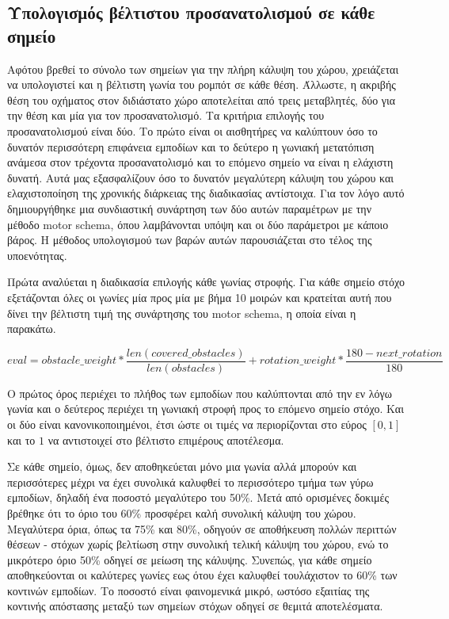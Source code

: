 \subsection{Υπολογισμός βέλτιστου προσανατολισμού σε κάθε σημείο}
\label{subsection:find_pose}

Αφότου βρεθεί το σύνολο των σημείων για την πλήρη κάλυψη του χώρου, χρειάζεται να υπολογιστεί και η βέλτιστη γωνία του ρομπότ σε κάθε θέση. Άλλωστε, η ακριβής θέση του οχήματος στον διδιάστατο χώρο αποτελείται από τρεις μεταβλητές, δύο για την θέση και μία για τον προσανατολισμό. Τα κριτήρια επιλογής του προσανατολισμού είναι δύο. Το πρώτο είναι οι αισθητήρες να καλύπτουν όσο το δυνατόν περισσότερη επιφάνεια εμποδίων και το δεύτερο η γωνιακή μετατόπιση ανάμεσα στον τρέχοντα προσανατολισμό και το επόμενο σημείο να είναι η ελάχιστη δυνατή. Αυτά μας εξασφαλίζουν όσο το δυνατόν μεγαλύτερη κάλυψη του χώρου και ελαχιστοποίηση της χρονικής διάρκειας της διαδικασίας αντίστοιχα. Για τον λόγο αυτό δημιουργήθηκε μια συνδιαστική συνάρτηση των δύο αυτών παραμέτρων με την μέθοδο motor schema, όπου λαμβάνονται υπόψη και οι δύο παράμετροι με κάποιο βάρος. Η μέθοδος υπολογισμού των βαρών αυτών παρουσιάζεται στο τέλος της υποενότητας.

Πρώτα αναλύεται η διαδικασία επιλογής κάθε γωνίας στροφής. Για κάθε σημείο στόχο εξετάζονται όλες οι γωνίες μία προς μία με βήμα 10 μοιρών και κρατείται αυτή που δίνει την βέλτιστη τιμή της συνάρτησης του motor schema, η οποία είναι η παρακάτω.

\[eval = obstacle\_weight * \frac{len(covered\_obstacles)}{len(obstacles)} + rotation\_weight * \frac{180 - next\_rotation}{180}\]

Ο πρώτος όρος περιέχει το πλήθος των εμποδίων που καλύπτονται από την εν λόγω γωνία και ο δεύτερος περιέχει τη γωνιακή στροφή προς το επόμενο σημείο στόχο. Και οι δύο είναι κανονικοποιημένοι, έτσι ώστε οι τιμές να περιορίζονται στο εύρος $[0,1]$ και το $1$ να αντιστοιχεί στο βέλτιστο επιμέρους αποτέλεσμα. 

Σε κάθε σημείο, όμως, δεν αποθηκεύεται μόνο μια γωνία αλλά μπορούν και περισσότερες μέχρι να έχει συνολικά καλυφθεί το περισσότερο τμήμα των γύρω εμποδίων, δηλαδή ένα ποσοστό μεγαλύτερο του 50\%. Μετά από ορισμένες δοκιμές βρέθηκε ότι το όριο του 60\% προσφέρει καλή συνολική κάλυψη του χώρου. Mεγαλύτερα όρια, όπως τα 75\% και 80\%, οδηγούν σε αποθήκευση πολλών περιττών θέσεων - στόχων χωρίς βελτίωση στην συνολική τελική κάλυψη του χώρου, ενώ το μικρότερο όριο 50\% οδηγεί σε μείωση της κάλυψης. Συνεπώς, για κάθε σημείο αποθηκεύονται οι καλύτερες γωνίες εως ότου έχει καλυφθεί τουλάχιστον το 60\% των κοντινών εμποδίων. Το ποσοστό είναι φαινομενικά μικρό, ωστόσο εξαιτίας της κοντινής απόστασης μεταξύ των σημείων στόχων οδηγεί σε θεμιτά αποτελέσματα. 

